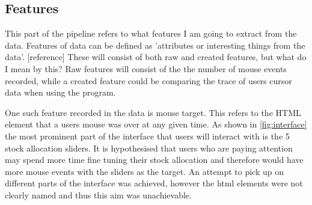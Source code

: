 \documentclass{article}
\begin{document}

\subsection{Features}




This part of the pipeline refers to what features I am going to extract from the data.
Features of data can be defined as 'attributes or interesting things from the data'. [reference]
These will consist of both raw and created features, but what do I mean by this?
Raw features will consist of the the number of mouse events recorded, while a created feature could be comparing the trace of users cursor data when using the program.

One such feature recorded in the data is mouse target.
This refers to the HTML element that a users mouse was over at any given time.
As shown in \ref{fig:interface} the most prominent part of the interface that users will interact with is the 5 stock allocation sliders.
It is hypothesised that users who are paying attention may spend more time fine tuning their stock allocation and therefore would have more mouse events with the sliders as the target.
An attempt to pick up on different parts of the interface was achieved, however the html elements were not clearly named and thus this aim was unachievable.
\end{document}
